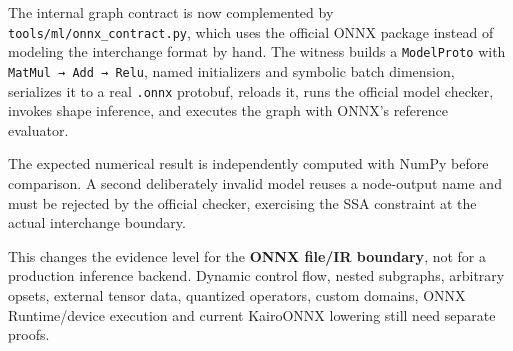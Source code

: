 The internal graph contract is now complemented by \texttt{tools/ml/onnx\_contract.py}, which uses the official ONNX package instead of modeling the interchange format by hand. The witness builds a \texttt{ModelProto} with \texttt{MatMul\ →\ Add\ →\ Relu}, named initializers and symbolic batch dimension, serializes it to a real \texttt{.onnx} protobuf, reloads it, runs the official model checker, invokes shape inference, and executes the graph with ONNX's reference evaluator.

The expected numerical result is independently computed with NumPy before comparison. A second deliberately invalid model reuses a node-output name and must be rejected by the official checker, exercising the SSA constraint at the actual interchange boundary.

This changes the evidence level for the \textbf{ONNX file/IR boundary}, not for a production inference backend. Dynamic control flow, nested subgraphs, arbitrary opsets, external tensor data, quantized operators, custom domains, ONNX Runtime/device execution and current KairoONNX lowering still need separate proofs.
